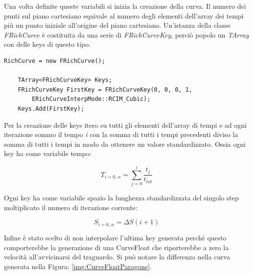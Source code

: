         Una volta definite queste variabili si inizia la creazione della curva.
        Il numero dei punti sul piano cartesiano equivale al numero degli elementi dell'array dei tempi più un punto iniziale all'origine del piano cartesiano.
        Un'istanza della classe \textit{FRichCurve} è costituita da una serie di \textit{FRichCurveKey}, perciò popolo un \textit{TArray} con delle keys di questo tipo.

        \begin{lstlisting}[firstnumber=15]
    RichCurve = new FRichCurve();

    TArray<FRichCurveKey> Keys;
    FRichCurveKey FirstKey = FRichCurveKey(0, 0, 0, 1, 
        ERichCurveInterpMode::RCIM_Cubic);
    Keys.Add(FirstKey);
        \end{lstlisting}

        Per la creazione delle keys itero su tutti gli elementi dell'array di tempi e ad ogni iterazione sommo il tempo \textit{i} con la somma di tutti i tempi precedenti diviso la somma di tutti i tempi in modo da ottenere un valore standardizzato.
        Ossia ogni key ha come variabile tempo:

        \begin{equation}
            T_{i = 0..n} = \sum^{i}_{j = 0} \frac{t_j}{t_{tot}}
        \end{equation}

        Ogni key ha come variabile spazio la lunghezza standardizzata del singolo step moltiplicato il numero di iterazione corrente:

        \begin{equation}
            S_{i = 0..n} =  \Delta S (i+1)
        \end{equation}

        Infine è stato scelto di non interpolare l'ultima key generata perché questo comporterebbe la generazione di una CurveFloat che riporterebbe a zero la velocità all'avvicinarsi del traguardo.
        Si può notare la differenza nella curva generata nella Figura: \ref{img:CurveFloatParagone}.

